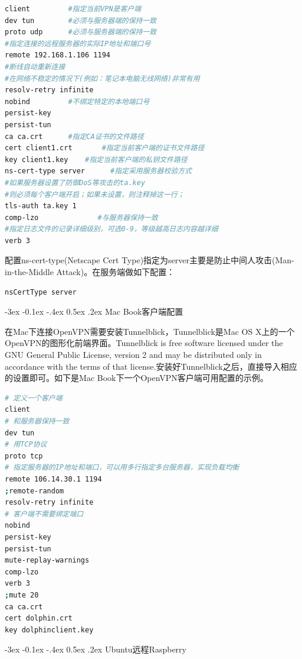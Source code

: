 \documentclass[11pt,fleqn]{book}
\makeatletter
\numberwithin{dummy}{section}
\theoremstyle{ocrenumbox}
\theoremstyle{blacknumex}
\theoremstyle{blacknumbox}
\theoremstyle{ocrenum}
\renewcommand{\subsection}{\@startsection {subsection}{2}{\z@}
	{-3ex \@plus -0.1ex \@minus -.4ex}
	{0.5ex \@plus.2ex }
	{\normalfont\sffamily\bfseries}}
\makeatother
\begin{document}
\begin{lstlisting}[language=Bash]
client         #指定当前VPN是客户端
dev tun        #必须与服务器端的保持一致
proto udp      #必须与服务器端的保持一致
#指定连接的远程服务器的实际IP地址和端口号
remote 192.168.1.106 1194      
#断线自动重新连接
#在网络不稳定的情况下(例如：笔记本电脑无线网络)非常有用
resolv-retry infinite
nobind         #不绑定特定的本地端口号
persist-key
persist-tun
ca ca.crt      #指定CA证书的文件路径
cert client1.crt       #指定当前客户端的证书文件路径
key client1.key    #指定当前客户端的私钥文件路径
ns-cert-type server      #指定采用服务器校验方式
#如果服务器设置了防御DoS等攻击的ta.key
#则必须每个客户端开启；如果未设置，则注释掉这一行；
tls-auth ta.key 1     
comp-lzo              #与服务器保持一致
#指定日志文件的记录详细级别，可选0-9，等级越高日志内容越详细
verb 3                
\end{lstlisting}

配置ns-cert-type(Netscape Cert Type)指定为server主要是防止中间人攻击(Man-in-the-Middle Attack)。在服务端做如下配置：

\begin{lstlisting}[language=Bash]
nsCertType server
\end{lstlisting}

\subsection{Mac Book客户端配置}

在Mac下连接OpenVPN需要安装Tunnelblick，Tunnelblick是Mac OS X上的一个OpenVPN的图形化前端界面。Tunnelblick is free software licensed under the GNU General Public License, version 2 and may be distributed only in accordance with the terms of that license.安装好Tunnelblick之后，直接导入相应的设置即可。如下是Mac Book下一个OpenVPN客户端可用配置的示例。

\begin{lstlisting}[language=Bash]
# 定义一个客户端
client
# 和服务器保持一致
dev tun
# 用TCP协议
proto tcp
# 指定服务器的IP地址和端口，可以用多行指定多台服务器，实现负载均衡
remote 106.14.30.1 1194
;remote-random
resolv-retry infinite
# 客户端不需要绑定端口
nobind
persist-key
persist-tun
mute-replay-warnings
comp-lzo
verb 3
;mute 20
ca ca.crt
cert dolphin.crt
key dolphinclient.key
\end{lstlisting}


\subsection{Ubuntu远程Raspberry}
\end{document}
